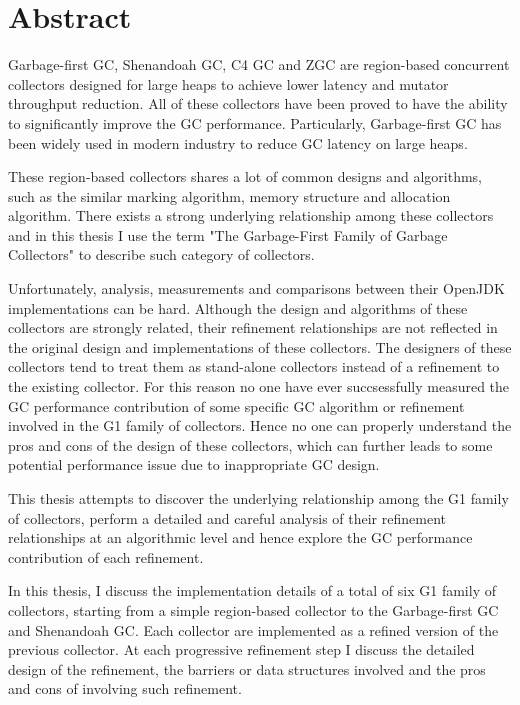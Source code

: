 \chapter*{Abstract}
\vspace{-1em}

Garbage-first GC,
Shenandoah GC, C4 GC and ZGC are region-based concurrent collectors designed for
large heaps to achieve lower latency and mutator throughput reduction.
All of these collectors have been proved to have the ability to
significantly improve the GC performance.
Particularly, Garbage-first GC has been widely used in modern industry to reduce
GC latency on large heaps.

These region-based collectors shares a lot of common designs and algorithms, such as
the similar marking algorithm, memory structure and allocation algorithm.
There exists a strong underlying relationship among these collectors and in this
thesis I use the term "The Garbage-First Family of Garbage Collectors" to describe
such category of collectors.

Unfortunately, analysis, measurements and comparisons between their OpenJDK implementations can be
hard. Although the design and algorithms of these collectors are strongly related,
their refinement relationships are not reflected in the
original design and implementations of these collectors.
The designers of these collectors tend to treat them as stand-alone collectors instead
of a refinement to the existing collector.
For this reason no one have ever succsessfully measured
the GC performance contribution of some specific GC algorithm or refinement involved
in the G1 family of collectors. Hence no one can properly understand the pros and cons
of the design of these collectors, which can further leads to some potential performance
issue due to inappropriate GC design.

This thesis attempts to discover the underlying relationship among the G1 family of collectors,
perform a detailed and careful analysis of their refinement relationships at an algorithmic level
and hence explore the GC performance contribution of each refinement.

In this thesis, I discuss the implementation details of a total of six G1 family
of collectors, starting from a simple region-based
collector to the Garbage-first GC and Shenandoah GC.
Each collector are implemented as a refined version of the previous collector.
At each progressive refinement step I discuss the detailed
design of the refinement, the barriers or data structures involved and the pros and cons
of involving such refinement.

